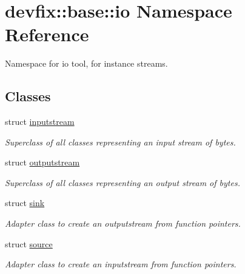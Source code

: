\hypertarget{namespacedevfix_1_1base_1_1io}{}\section{devfix\+:\+:base\+:\+:io Namespace Reference}
\label{namespacedevfix_1_1base_1_1io}


Namespace for io tool, for instance streams.  


\subsection*{Classes}
\begin{DoxyCompactItemize}
\item 
struct \hyperlink{structdevfix_1_1base_1_1io_1_1inputstream}{inputstream}
\begin{DoxyCompactList}\small\item\em Superclass of all classes representing an input stream of bytes. \end{DoxyCompactList}\item 
struct \hyperlink{structdevfix_1_1base_1_1io_1_1outputstream}{outputstream}
\begin{DoxyCompactList}\small\item\em Superclass of all classes representing an output stream of bytes. \end{DoxyCompactList}\item 
struct \hyperlink{structdevfix_1_1base_1_1io_1_1sink}{sink}
\begin{DoxyCompactList}\small\item\em Adapter class to create an {\itshape outputstream} from function pointers. \end{DoxyCompactList}\item 
struct \hyperlink{structdevfix_1_1base_1_1io_1_1source}{source}
\begin{DoxyCompactList}\small\item\em Adapter class to create an {\itshape inputstream} from function pointers. \end{DoxyCompactList}\end{DoxyCompactItemize}
